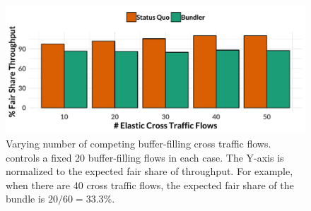 \begin{figure}
    \centering
\begin{knitrout}
\color{fgcolor}
\includegraphics[width=\maxwidth]{figure/robust:cr-elastic-1} 

\end{knitrout}
    \caption{Varying number of competing buffer-filling cross traffic flows. \name controls a fixed 20 buffer-filling flows in each case. The Y-axis is normalized to the expected fair share of throughput. For example, when there are 40 cross traffic flows, the expected fair share of the bundle is $20 / 60 = 33.3\%$.}
    \label{fig:robust:cr-elastic}
\end{figure}
